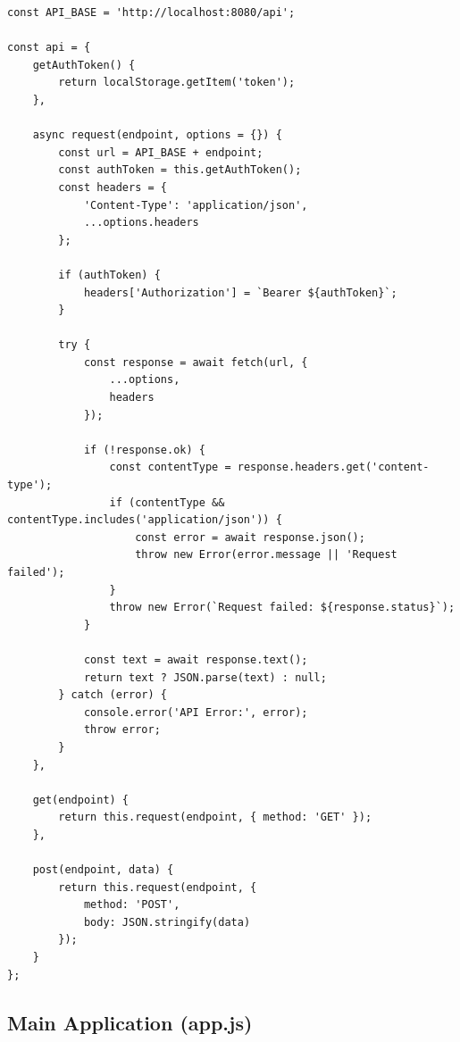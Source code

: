\documentclass[12pt,a4paper,twoside]{book}
\begin{document}
\begin{lstlisting}[style=javascript]
const API_BASE = 'http://localhost:8080/api';

const api = {
    getAuthToken() {
        return localStorage.getItem('token');
    },
    
    async request(endpoint, options = {}) {
        const url = API_BASE + endpoint;
        const authToken = this.getAuthToken();
        const headers = {
            'Content-Type': 'application/json',
            ...options.headers
        };
        
        if (authToken) {
            headers['Authorization'] = `Bearer ${authToken}`;
        }
        
        try {
            const response = await fetch(url, {
                ...options,
                headers
            });
            
            if (!response.ok) {
                const contentType = response.headers.get('content-type');
                if (contentType && contentType.includes('application/json')) {
                    const error = await response.json();
                    throw new Error(error.message || 'Request failed');
                }
                throw new Error(`Request failed: ${response.status}`);
            }
            
            const text = await response.text();
            return text ? JSON.parse(text) : null;
        } catch (error) {
            console.error('API Error:', error);
            throw error;
        }
    },
    
    get(endpoint) {
        return this.request(endpoint, { method: 'GET' });
    },
    
    post(endpoint, data) {
        return this.request(endpoint, {
            method: 'POST',
            body: JSON.stringify(data)
        });
    }
};
\end{lstlisting}

\subsection{Main Application (app.js)}
\end{document}
